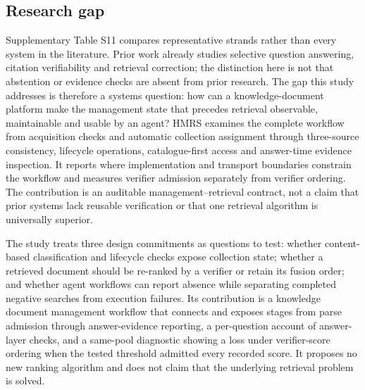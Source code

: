\subsection{Research gap}
\label{sec:gap}

Supplementary Table S11 compares representative strands rather than every
system in the literature. Prior work already studies selective question
answering, citation verifiability and retrieval correction; the distinction
here is not that abstention or evidence checks are absent from prior research.
The gap this study addresses is therefore a systems question: how can a
knowledge-document platform make the management state that precedes retrieval
observable, maintainable and usable by an agent? HMRS examines the complete
workflow from acquisition checks and automatic collection assignment through
three-source consistency, lifecycle operations, catalogue-first access and
answer-time evidence inspection. It reports where implementation and transport
boundaries constrain the workflow and measures verifier admission separately
from verifier ordering. The contribution is an auditable management--retrieval
contract, not a claim that prior systems lack reusable verification or that one
retrieval algorithm is universally superior.

The study treats three design commitments as questions to test: whether
content-based classification and lifecycle checks expose collection state;
whether a retrieved document should be re-ranked by a verifier or retain its
fusion order; and whether agent workflows can report absence while separating
completed negative searches from execution failures. Its contribution is a
knowledge document management workflow that connects and exposes stages from
parse admission through answer-evidence reporting, a per-question account of
answer-layer checks, and a same-pool diagnostic showing a loss under verifier-score ordering
when the tested threshold admitted every recorded score. It
proposes no new ranking algorithm and does not claim that the underlying
retrieval problem is solved.
